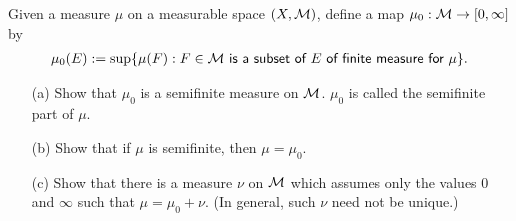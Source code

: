 \begin{prob}[Exercise 1.15]
    Given a measure $\mu$ on a measurable space $(X, {\mathcal{M}})$, define a map $\mu_0: {\mathcal{M}}\rightarrow[0, \infty]$ by
    \begin{align*}
        \mu_0(E):=\sup\{\mu(F):F\in{\mathcal{M}}\textsf{ is a subset of }E\textsf{ of finite measure for }\mu\}.
    \end{align*}
    \begin{enumerate}
        \item[(a)]
        {
            Show that $\mu_0$ is a semifinite measure on ${\mathcal{M}}$.
            $\mu_0$ is called the semifinite part of $\mu$.
        }
        \item[(b)]
        {    
            Show that if $\mu$ is semifinite, then $\mu=\mu_0$.
        }
        \item[(c)]
        {
            Show that there is a measure $\nu$ on ${\mathcal{M}}$ which assumes only the values $0$ and $\infty$ such that $\mu=\mu_0+\nu$.
            (In general, such $\nu$ need not be unique.)
        }
    \end{enumerate}
\end{prob}
